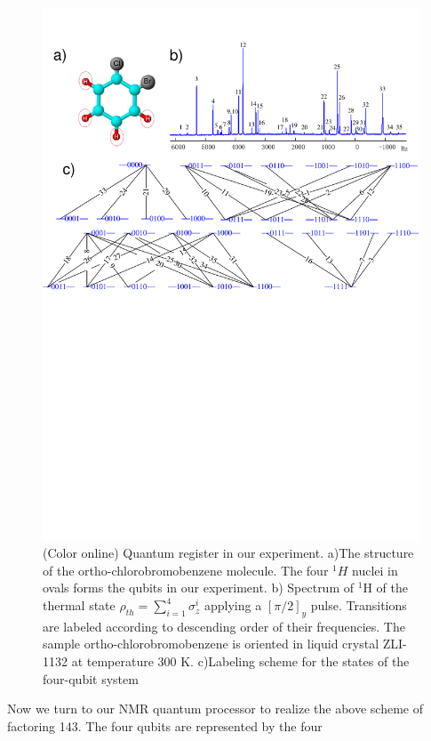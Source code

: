 \documentclass[twocolumn,showpacs,twoside,10pt,prl]{revtex4}
\begin{document}

\begin{figure}[htbp]
\begin{center}
\includegraphics[width=0.9\columnwidth]{sample_spectrum}
\caption{\label{sample_spectrum} (Color online) Quantum register in our experiment. a)The
structure of the ortho-chlorobromobenzene molecule. The four $^1H$
nuclei in ovals forms the qubits in our experiment. b)
 Spectrum of $^1$H of the thermal state
$\rho_{th}=\sum_{i=1}^4 \sigma_z^i$ applying a $[\pi/2]_y$ pulse. Transitions are labeled
according to descending order of their frequencies. The sample
ortho-chlorobromobenzene is oriented in liquid crystal ZLI-1132 at
temperature 300 K. c)Labeling scheme for the states of the
four-qubit system}
\end{center}

\end{figure}
Now we turn to our NMR quantum processor to realize the above
scheme of factoring 143. The four qubits are represented by the four
\end{document}
